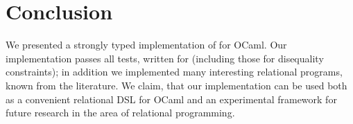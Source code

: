 \section{Conclusion}

We presented a strongly typed implementation of \miniKanren for OCaml. Our implementation
passes all tests, written for \miniKanren (including those for disequality constraints);
in addition we implemented many interesting relational programs, known from
the literature. We claim, that our implementation can be used both as a convenient
relational DSL for OCaml and an experimental framework for future research in the area of
relational programming. 

